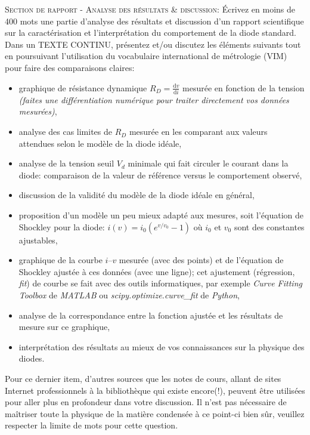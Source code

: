 \documentclass[canadien,12pt,oneside,letterpaper]{article}
\begin{document}
\begin{gradescope}[resume]
    \item \textsc{Section de rapport - Analyse des résultats \& discussion:} Écrivez en moins de 400 mots une partie d'analyse des résultats et discussion d'un rapport scientifique sur la caractérisation et l'interprétation du comportement de la diode standard. Dans un TEXTE CONTINU, présentez et/ou discutez les éléments suivants tout en poursuivant l'utilisation du vocabulaire international de métrologie (VIM) pour faire des comparaisons claires:
\begin{itemize}
    \item graphique de résistance dynamique $R_{D}=\frac{\mathrm{d}v}{\mathrm{d}i}$ mesurée en fonction de la tension \emph{(faites une différentiation numérique pour traiter directement vos données mesurées)},
    \item analyse des cas limites de $R_{D}$ mesurée en les comparant aux valeurs attendues selon le modèle de la diode idéale,
    \item analyse de la tension seuil $V_{d}$ minimale qui fait circuler le courant dans la diode: comparaison de la valeur de référence versus le comportement observé, 
    \item discussion de la validité du modèle de la diode idéale en général,
    \item proposition d'un modèle un peu mieux adapté aux mesures, soit l'équation de Shockley pour la diode: $i\left( v\right) = i_0\left(e^{v/v_0}-1 \right)$ où $i_0$ et $v_0$ sont des constantes ajustables,
    \item graphique de la courbe $i$--$v$ mesurée (avec des points) et de l'équation de Shockley ajustée à ces données (avec une ligne); cet ajustement (régression, \textit{fit}) de courbe se fait avec des outils informatiques, par exemple \textit{Curve Fitting Toolbox} de \textit{MATLAB} ou \textit{scipy.optimize.curve\_fit} de \textit{Python},
    \item analyse de la correspondance entre la fonction ajustée et les résultats de mesure sur ce graphique,
    \item interprétation des résultats au mieux de vos connaissances sur la physique des diodes.
\end{itemize}
\end{gradescope}

Pour ce dernier item, d'autres sources que les notes de cours, allant de sites Internet professionnels à la bibliothèque qui existe encore(!), peuvent être utilisées pour aller plus en profondeur dans votre discussion. Il n'est pas nécessaire de maîtriser toute la physique de la matière condensée à ce point-ci bien sûr, veuillez respecter la limite de mots pour cette question.
\end{document}
